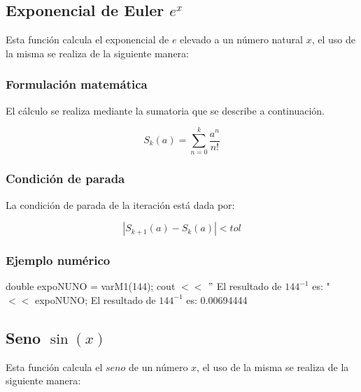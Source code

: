 \documentclass[10pt,a4paper]{article}
\begin{document}
	\subsection{Exponencial de Euler $e^{x}$}
	
	Esta función calcula el exponencial de $e$ elevado a un número natural $x$, el uso de la misma se realiza de la siguiente manera:
	
	\begin{center}
	\end{center}
	
	\subsubsection{Formulación matemática}
	
	El cálculo se realiza mediante la sumatoria que se describe a continuación.
	
	\begin{equation}\label{key4}
		S_{k}(a) = \sum_{n=0}^{k}\frac{a^{n}}{n!}
	\end{equation}
	
	\subsubsection{Condición de parada}
	
	La condición de parada de la iteración está dada por: 
	
	\begin{equation}\label{key5}
		\left\lvert S_{k+1}(a) - S_{k}(a) \right\lvert < tol
	\end{equation}
	
	\subsubsection{Ejemplo numérico}

	double expoNUNO = varM1(144); \newline
	cout $<<$ $"$ El resultado de $144^{-1}$ es: " $<<$ expoNUNO; \newline
	El resultado de $144^{-1}$ es: 0.00694444\newline

	\subsection{Seno $\sin(x)$}
	
	Esta función calcula el $seno$ de un número $x$, el uso de la misma se realiza de la siguiente manera:
	
\end{document}
